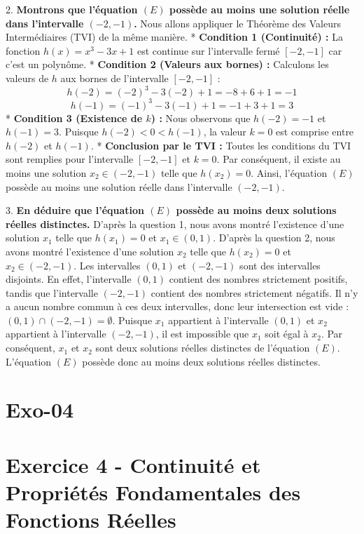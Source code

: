\documentclass[12pt,a4paper]{report}
\begin{document}
2.  \textbf{Montrons que l'équation $(E)$ possède au moins une solution réelle dans l'intervalle $(-2, -1)$.}
    Nous allons appliquer le Théorème des Valeurs Intermédiaires (TVI) de la même manière.
    *   \textbf{Condition 1 (Continuité) :} La fonction $h(x) = x^3 - 3x + 1$ est continue sur l'intervalle fermé $[-2, -1]$ car c'est un polynôme.
    *   \textbf{Condition 2 (Valeurs aux bornes) :} Calculons les valeurs de $h$ aux bornes de l'intervalle $[-2, -1]$ :
        $$ h(-2) = (-2)^3 - 3(-2) + 1 = -8 + 6 + 1 = -1 $$
        $$ h(-1) = (-1)^3 - 3(-1) + 1 = -1 + 3 + 1 = 3 $$
    *   \textbf{Condition 3 (Existence de $k$) :} Nous observons que $h(-2) = -1$ et $h(-1) = 3$. Puisque $h(-2) < 0 < h(-1)$, la valeur $k=0$ est comprise entre $h(-2)$ et $h(-1)$.
    *   \textbf{Conclusion par le TVI :} Toutes les conditions du TVI sont remplies pour l'intervalle $[-2, -1]$ et $k=0$.
        Par conséquent, il existe au moins une solution $x_2 \in (-2, -1)$ telle que $h(x_2) = 0$.
    Ainsi, l'équation $(E)$ possède au moins une solution réelle dans l'intervalle $(-2, -1)$.

3.  \textbf{En déduire que l'équation $(E)$ possède au moins deux solutions réelles distinctes.}
    D'après la question 1, nous avons montré l'existence d'une solution $x_1$ telle que $h(x_1) = 0$ et $x_1 \in (0, 1)$.
    D'après la question 2, nous avons montré l'existence d'une solution $x_2$ telle que $h(x_2) = 0$ et $x_2 \in (-2, -1)$.
    Les intervalles $(0, 1)$ et $(-2, -1)$ sont des intervalles disjoints.
    En effet, l'intervalle $(0, 1)$ contient des nombres strictement positifs, tandis que l'intervalle $(-2, -1)$ contient des nombres strictement négatifs. Il n'y a aucun nombre commun à ces deux intervalles, donc leur intersection est vide : $(0, 1) \cap (-2, -1) = \emptyset$.
    Puisque $x_1$ appartient à l'intervalle $(0, 1)$ et $x_2$ appartient à l'intervalle $(-2, -1)$, il est impossible que $x_1$ soit égal à $x_2$.
    Par conséquent, $x_1$ et $x_2$ sont deux solutions réelles distinctes de l'équation $(E)$.
    L'équation $(E)$ possède donc au moins deux solutions réelles distinctes.

\section{Exo-04}
\section{Exercice 4 - Continuité et Propriétés Fondamentales des Fonctions Réelles}
\end{document}
